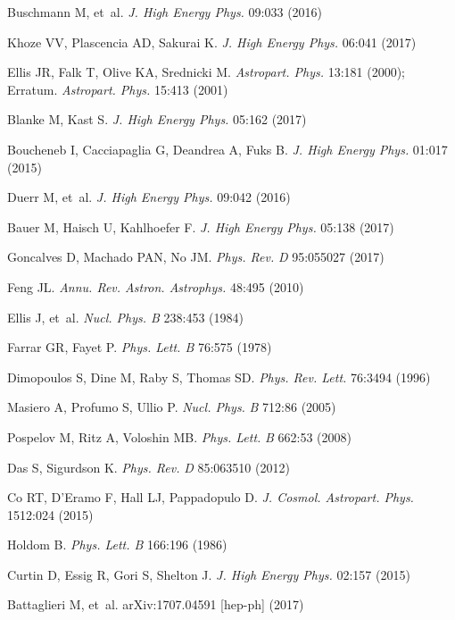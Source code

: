 \documentclass{ar-1col}
\begin{document}
\begin{thebibliography}{175}
Buschmann M, et~al. \textit{J. High Energy Phys.} 09:033 (2016)

Khoze VV, Plascencia AD, Sakurai K. \textit{J. High Energy Phys.} 06:041 (2017)

Ellis JR, Falk T, Olive KA, Srednicki M. \textit{Astropart. Phys.}
13:181 (2000); Erratum. \textit{Astropart. Phys.} 15:413 (2001)

Blanke M, Kast S. \textit{J. High Energy Phys.} 05:162 (2017)

Boucheneb I, Cacciapaglia G, Deandrea A, Fuks B. \textit{J. High Energy Phys.}
01:017 (2015)

Duerr M, et~al. \textit{J. High Energy Phys.} 09:042 (2016)

Bauer M, Haisch U, Kahlhoefer F. \textit{J. High Energy Phys.} 05:138 (2017)

Goncalves D, Machado PAN, No JM. \textit{Phys. Rev.} \textit{D} 95:055027
(2017)

Feng JL. \textit{Annu. Rev. Astron. Astrophys.} 48:495 (2010)

{Ellis} J, et~al. \textit{Nucl. Phys. B} 238:453 (1984)

Farrar GR, Fayet P. \textit{Phys. Lett. B} 76:575 (1978)

Dimopoulos S, Dine M, Raby S, Thomas SD. \textit{Phys. Rev. Lett.}
76:3494 (1996)

Masiero A, Profumo S, Ullio P. \textit{Nucl. Phys.} \textit{B} 712:86 (2005)

Pospelov M, Ritz A, Voloshin MB. \textit{Phys. Lett.} \textit{B} 662:53
(2008)

Das S, Sigurdson K. \textit{Phys. Rev.} \textit{D} 85:063510 (2012)

Co RT, D'Eramo F, Hall LJ, Pappadopulo D. \textit{J. Cosmol. Astropart. Phys.} 1512:024
(2015)

Holdom B. \textit{Phys. Lett. B} 166:196 (1986)

Curtin D, Essig R, Gori S, Shelton J. \textit{J. High Energy Phys.} 02:157 (2015)

Battaglieri M, et~al. arXiv:1707.04591 [hep-ph] (2017)


\end{thebibliography}
\end{document}
